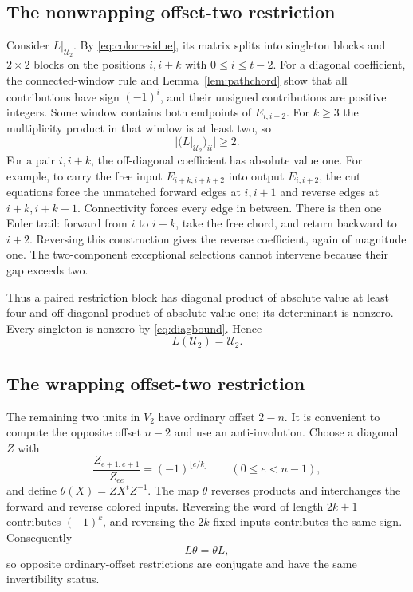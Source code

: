\subsection{The nonwrapping offset-two restriction}
Consider $L|_{\mathcal U_2}$. By \eqref{eq:colorresidue},
its matrix splits into singleton blocks and $2\times2$ blocks
on the positions $i,i+k$ with $0\le i\le t-2$.
For a diagonal coefficient, the connected-window rule and
Lemma~\ref{lem:pathchord} show that all contributions have sign
$(-1)^i$, and their unsigned contributions are positive integers.
Some window contains both endpoints of $E_{i,i+2}$. For $k\ge3$
the multiplicity product in that window is at least two, so
\begin{equation}\label{eq:diagbound}
 |(L|_{\mathcal U_2})_{ii}|\ge2.
\end{equation}
For a pair $i,i+k$, the off-diagonal coefficient has absolute
value one. For example, to carry the free input
$E_{i+k,i+k+2}$ into output $E_{i,i+2}$, the cut equations force
the unmatched forward edges at $i,i+1$ and reverse edges at
$i+k,i+k+1$. Connectivity forces every edge in between. There
is then one Euler trail: forward from $i$ to $i+k$, take the
free chord, and return backward to $i+2$. Reversing this
construction gives the reverse coefficient, again of magnitude
one. The two-component exceptional selections cannot intervene
because their gap exceeds two.

Thus a paired restriction block has diagonal product of absolute
value at least four and off-diagonal product of absolute value
one; its determinant is nonzero. Every singleton is nonzero by
\eqref{eq:diagbound}. Hence
\begin{equation}\label{eq:U2}
 L(\mathcal U_2)=\mathcal U_2.
\end{equation}

\subsection{The wrapping offset-two restriction}
The remaining two units in $V_2$ have ordinary offset $2-n$.
It is convenient to compute the opposite offset $n-2$ and use
an anti-involution. Choose a diagonal $Z$ with
\begin{equation}\label{eq:Z}
 \frac{Z_{e+1,e+1}}{Z_{ee}}=(-1)^{\lfloor e/k\rfloor}
 \qquad(0\le e<n-1),
\end{equation}
and define $\theta(X)=ZX^tZ^{-1}$.
The map $\theta$ reverses products and interchanges the forward
and reverse colored inputs. Reversing the word of length $2k+1$
contributes $(-1)^k$, and reversing the $2k$ fixed inputs
contributes the same sign. Consequently
\begin{equation}\label{eq:theta}
 L\theta=\theta L,
\end{equation}
so opposite ordinary-offset restrictions are conjugate and have
the same invertibility status.

